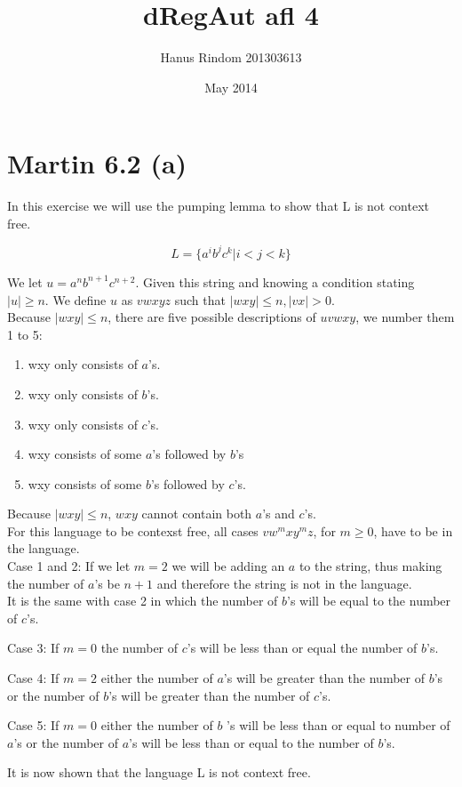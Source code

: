 \documentclass{article}
\title{dRegAut afl 4}
\author{Hanus Rindom 201303613}
\date{May 2014}
\begin{document}
\maketitle

\section*{Martin 6.2 (a)}
In this exercise we will use the pumping lemma to show that L is not context free.

$$ L= \{ a^i b^j c^k | i < j < k \} $$
    
    We let $ u = a^n b^{n+1} c^{n+2} $. Given this string and knowing a condition stating  $ |u| \geq n $. We define $ u $ as $ vwxyz $ such that $ |wxy| \leq n, |vx| > 0 $.\\
    Because $ |wxy| \leq n $, there are five possible descriptions of $ uvwxy $, we number them 1 to 5:
        
\begin{enumerate}
  \item wxy only consists of $ a $'s.
  \item wxy only consists of $ b $'s.
  \item wxy only consists of $ c $'s.
  \item wxy consists of some $ a $'s followed by $ b $'s
  \item wxy consists of some $ b $'s followed by $ c $'s.
\end{enumerate}
    
    
    
        Because $ |wxy| \leq n $, $wxy$ cannot contain both $a$'s and $c$'s.\\
        For this language to be contexst free, all cases $ v w^m x y^m z$, for $ m \geq 0 $, have to be in the language.\\
        
        Case 1 and 2: If we let $m=2$ we will be adding an $ a $ to the string, thus making the
        number of $a$'s be $n+1$ and therefore the string is not in the language.\\
        It is the same with case 2 in which the number of $b$'s will be
        equal to the number of $c$'s.
        
        Case 3: If $ m=0 $ the number of $c$'s will be less than or equal
        the number of $b$'s.
        
        Case 4: If $ m=2 $ either the number of $ a $'s will be greater than the
        number of $ b $'s or the number of $ b $'s will be greater than the number of
        $ c $'s.
        
        Case 5: If $ m=0 $ either the number of $ b $ 's will be less than or equal
        to number of $ a $'s or the number of $ a $'s will be less than or equal to
        the number of $ b $'s.
        
        It is now shown that the language L is not context free.
\end{document}
